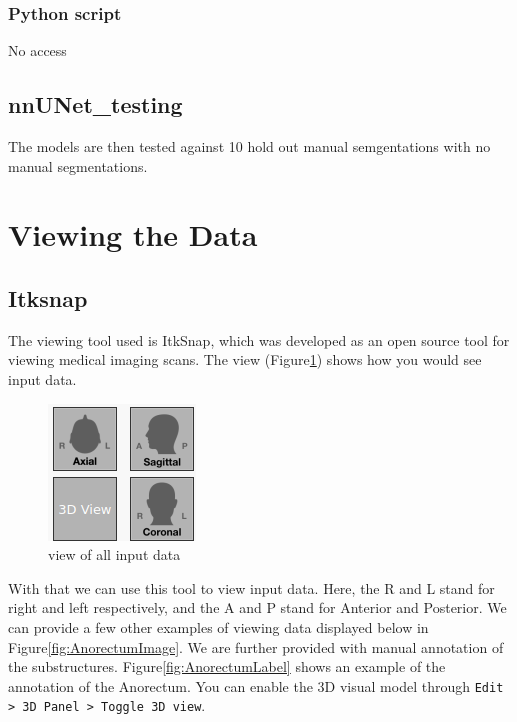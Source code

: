 \documentclass[11pt]{article}
\begin{document}
\subsubsection{Python script}

No access

\subsection{nnUNet\_testing}

The models are then tested against 10 hold out manual semgentations with no manual segmentations.

\section{Viewing the Data}

\subsection{Itksnap}\label{section:itksnap}

The viewing tool used is ItkSnap, which was developed as an open source tool for viewing medical imaging scans. The view (Figure\ref{fig:view}) shows how you would see input data.

\begin{figure}[H]
    \centering
    \includegraphics[]{images/view.png}
    \caption{view of all input data}\label{fig:view}
\end{figure}

With that we can use this tool to view input data. Here, the R and L stand for right and left respectively, and the A and P stand for Anterior and Posterior. We can provide a few other examples of viewing data displayed below in Figure\ref{fig:AnorectumImage}. We are further provided with manual annotation of the substructures. Figure\ref{fig:AnorectumLabel} shows an example of the annotation of the Anorectum. You can enable the 3D visual model through \texttt{Edit > 3D Panel > Toggle 3D view}.
\end{document}
